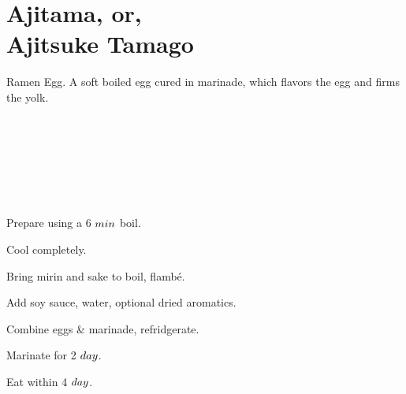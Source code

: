 \section[Ajitama]{
    Ajitama, or, \\Ajitsuke Tamago
}

\begin{recipestats}[
        preptime=8~\minute,
        bakingtime=7~\minute,
        source=\citeauthor{ajitamaLiaw}~\cite{ajitamaLiaw},
    ]
\end{recipestats}

\begin{recipeabstract}
    Ramen Egg.
    A soft boiled egg cured in marinade, which flavors the egg and firms the yolk.
\end{recipeabstract}

\begin{ingredientcolumns}
    \begin{ingredientblock}
        \\
        \\
    \end{ingredientblock}
    \begin{ingredientblock}
        \\
        \\
        \\
    \end{ingredientblock}
\end{ingredientcolumns}

\begin{preparation}
\item Prepare  using a 6 $\minute$ boil.
\item Cool completely.
\item Bring mirin and sake to boil, flamb\'{e}.
\item Add soy sauce, water, optional dried aromatics.
\item Combine eggs \& marinade, refridgerate.
\item Marinate for 2 $\Day$.
\item Eat within 4 $\Day$.
\end{preparation}

\recipeend%
